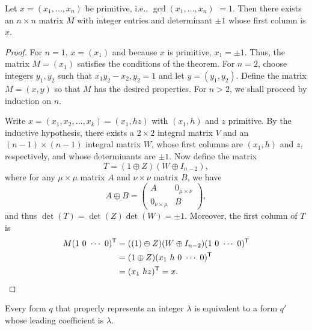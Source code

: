 \begin{theorem}{\normalfont\cite[p.~6]{watson1960integral}} Let \(x = (x_1,
    \dots, x_n)\) be primitive, i.e., \(\gcd(x_1, \dots, x_n)\) \(= 1\). Then
    there exists an \(n \times n\) matrix \(M\) with integer entries and
    determinant \(\pm 1\) whose first column is \(x\).
\end{theorem}

\begin{proof}
    For \(n = 1\), \(x = (x_1)\) and because \(x\) is primitive, \(x_1 = \pm
    1\). Thus, the matrix \(M = (x_1)\) satisfies the conditions of the theorem.
    For \(n = 2\), choose integers \(y_1, y_2\) such that \(x_1y_2 - x_2, y_2 =
    1\) and let \(y = (y_1, y_2)\). Define the matrix \(M = (x, y)\) so that
    \(M\) has the desired properties. For \(n > 2\), we shall proceed by
    induction on \(n\).
    
    Write \(x = (x_1, x_2, \dots, x_k) = (x_1, hz)\) with \((x_1, h)\) and \(z\)
    primitive. By the inductive hypothesis, there exists a \(2 \times 2\)
    integral matrix \(V\) and an \((n - 1) \times (n - 1)\) integral matrix
    \(W\), whose first columns are \((x_1, h)\) and \(z\), respectively, and
    whose determinants are \(\pm 1\). Now define the matrix
    \[
      T = (1 \oplus Z)(W \oplus I_{n - 2}),
    \]
    where for any \(\mu \times \mu\) matrix \(A\) and \(\nu \times \nu\) matrix
    \(B\), we have
    \[
      A \oplus B = \begin{pmatrix}
        A & 0_{\mu \times \nu} \\
        0_{\nu \times \mu} & B
      \end{pmatrix},
    \]
    and thus \(\det(T) = \det(Z)\det(W) = \pm 1\). Moreover, the first column of
    \(T\) is
    \begin{align*}
      M(1\ 0\ \cdots\ 0)^{\mathsf{T}} &= ((1) \oplus Z)(W \oplus I_{n - 2})(1\ 0\ \cdots\ 0)^{\mathsf{T}}\\
      &= (1 \oplus Z)(x_1\ h\ 0\ \cdots\ 0)^{\mathsf{T}}\\
      &= (x_1\ hz)^{\mathsf{T}} = x.
    \end{align*}
\end{proof}

\begin{corollary}{\normalfont\cite[p.~6]{watson1960integral}}
  \label{cor:leading-coefficient}
    Every form \(q\) that properly represents an integer \(\lambda\) is
    equivalent to a form \(q'\) whose leading coefficient is \(\lambda\).
\end{corollary}

